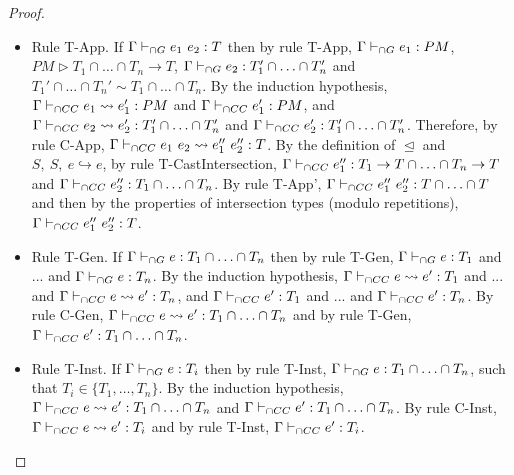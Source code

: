 \documentclass[a4paper]{article}
\begin{document}
\begin{proof}
\begin{itemize}
    \item Rule T-App.
    If $\Gamma \vdash_{\cap G} e_1\ e_2 : T$ then by rule T-App, $\Gamma \vdash_{\cap G} e_1 : PM$, $PM \rhd T_1 \cap \ldots \cap T_n \rightarrow T$, $\Gamma \vdash_{\cap G} e_2 : T_1' \cap \ldots \cap T_n'$ and $T_1' \cap \ldots \cap T_n' \sim T_1 \cap \ldots \cap T_n$.
    By the induction hypothesis, $\Gamma \vdash_{\cap CC} e_1 \leadsto e_1' : PM$ and $\Gamma \vdash_{\cap CC} e_1' : PM$, and $\Gamma \vdash_{\cap CC} e_2 \leadsto e_2' : T_1' \cap \ldots \cap T_n'$ and $\Gamma \vdash_{\cap CC} e_2' : T_1' \cap \ldots \cap T_n'$.
    Therefore, by rule C-App, $\Gamma \vdash_{\cap CC} e_1\ e_2 \leadsto e_1''\ e_2'' : T$.
    By the definition of $\trianglelefteq$ and $S,\ S,\ e \hookrightarrow e$, by rule T-CastIntersection, $\Gamma \vdash_{\cap CC} e_1'' : T_1 \rightarrow T \cap \ldots \cap T_n \rightarrow T$ and $\Gamma \vdash_{\cap CC} e_2'' : T_1 \cap \ldots \cap T_n$.
    By rule T-App', $\Gamma \vdash_{\cap CC} e_1''\ e_2'' : T \cap \ldots \cap T$ and then by the properties of intersection types (modulo repetitions), $\Gamma \vdash_{\cap CC} e_1''\ e_2'' : T$.
    \item Rule T-Gen.
    If $\Gamma \vdash_{\cap G} e : T_1 \cap \ldots \cap T_n$ then by rule T-Gen, $\Gamma \vdash_{\cap G} e : T_1$ and ... and $\Gamma \vdash_{\cap G} e : T_n$.
    By the induction hypothesis, $\Gamma \vdash_{\cap CC} e \leadsto e' : T_1$ and ... and $\Gamma \vdash_{\cap CC} e \leadsto e' : T_n$, and $\Gamma \vdash_{\cap CC} e' : T_1$ and ... and $\Gamma \vdash_{\cap CC} e' : T_n$.
    By rule C-Gen, $\Gamma \vdash_{\cap CC} e \leadsto e' : T_1 \cap \ldots \cap T_n$ and by rule T-Gen, $\Gamma \vdash_{\cap CC} e' : T_1 \cap \ldots \cap T_n$.
    \item Rule T-Inst.
    If $\Gamma \vdash_{\cap G} e : T_i$ then by rule T-Inst, $\Gamma \vdash_{\cap G} e : T_1 \cap \ldots \cap T_n$, such that $T_i \in \{T_1, \ldots, T_n\}$.
    By the induction hypothesis, $\Gamma \vdash_{\cap CC} e \leadsto e' : T_1 \cap \ldots \cap T_n$ and $\Gamma \vdash_{\cap CC} e' : T_1 \cap \ldots \cap T_n$.
    By rule C-Inst, $\Gamma \vdash_{\cap CC} e \leadsto e' : T_i$ and by rule T-Inst, $\Gamma \vdash_{\cap CC} e' : T_i$.
\end{itemize}
\end{proof}
\end{document}
